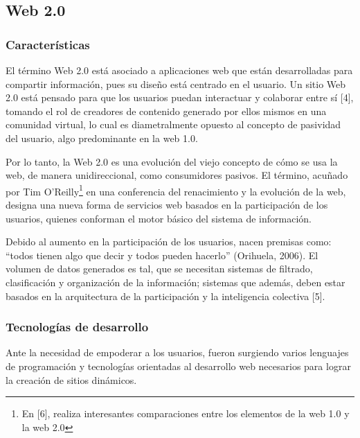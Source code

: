 \subsection{Web 2.0}
\subsubsection{Características}

El término Web 2.0 está asociado a aplicaciones web que están desarrolladas para compartir información, 
pues su diseño está centrado en el usuario. Un sitio Web 2.0 está pensado para que los usuarios puedan interactuar 
y colaborar entre sí [4], tomando el rol de creadores de contenido generado por ellos mismos en una comunidad virtual,
lo cual es diametralmente opuesto al concepto de pasividad del usuario, algo predominante en la web 1.0.

Por lo tanto, la Web 2.0 es una evolución del viejo concepto de cómo se usa la web, de manera
unidireccional, como consumidores pasivos. El término, acuñado por Tim O'Reilly\footnote{En [6], realiza interesantes 
comparaciones entre los elementos de la web 1.0 y la web 2.0} en una conferencia del renacimiento y la evolución de la web, 
designa una nueva forma de servicios web basados en la participación de los usuarios, quienes conforman el motor básico del 
sistema de información.

Debido al aumento en la participación de los usuarios, nacen premisas como: “todos tienen algo que decir y todos pueden hacerlo” 
(Orihuela, 2006). El volumen de datos generados es tal, que se necesitan sistemas de filtrado, clasificación y 
organización de la información; sistemas que además, deben estar basados en la arquitectura de la participación y la inteligencia 
colectiva [5].


\subsubsection{Tecnologías de desarrollo}
Ante la necesidad de empoderar a los usuarios, fueron surgiendo varios lenguajes de programación y tecnologías orientadas
al desarrollo web necesarios para lograr la creación de sitios dinámicos.

